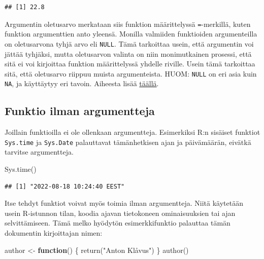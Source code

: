 \documentclass[
]{book}
\newenvironment{Shaded}{\begin{snugshade}}{\end{snugshade}}
\newcommand{\ControlFlowTok}[1]{\textcolor[rgb]{0.13,0.29,0.53}{\textbf{#1}}}
\newcommand{\FunctionTok}[1]{\textcolor[rgb]{0.00,0.00,0.00}{#1}}
\newcommand{\NormalTok}[1]{#1}
\newcommand{\OtherTok}[1]{\textcolor[rgb]{0.56,0.35,0.01}{#1}}
\newcommand{\StringTok}[1]{\textcolor[rgb]{0.31,0.60,0.02}{#1}}
\begin{document}
\begin{verbatim}
## [1] 22.8
\end{verbatim}

Argumentin oletusarvo merkataan siis funktion määrittelyssä \texttt{=}-merkillä, kuten funktion argumenttien anto yleensä. Monilla valmiiden funktioiden argumenteilla on oletusarvona tyhjä arvo eli \texttt{NULL}. Tämä tarkoittaa usein, että argumentin voi jättää tyhjäksi, mutta oletusarvon valinta on niin monimutkainen prosessi, että sitä ei voi kirjoittaa funktion määrittelyssä yhdelle riville. Usein tämä tarkoittaa sitä, että oletusarvo riippuu muista argumenteista. HUOM: \texttt{NULL} on eri asia kuin \texttt{NA}, ja käyttäytyy eri tavoin. Aiheesta lisää \href{https://www.r-bloggers.com/r-na-vs-null/}{täällä}.

\hypertarget{funktio-ilman-argumentteja}{%
\subsection{Funktio ilman argumentteja}\label{funktio-ilman-argumentteja}}

Joillain funktioilla ei ole ollenkaan argumentteja. Esimerkiksi R:n sisäiset funktiot \texttt{Sys.time} ja \texttt{Sys.Date} palauttavat tämänhetkisen ajan ja päivämäärän, eivätkä tarvitse argumentteja.

\begin{Shaded}
\begin{Highlighting}[]
\FunctionTok{Sys.time}\NormalTok{()}
\end{Highlighting}
\end{Shaded}

\begin{verbatim}
## [1] "2022-08-18 10:24:40 EEST"
\end{verbatim}

Itse tehdyt funktiot voivat myös toimia ilman argumentteja. Niitä käytetään usein R-istunnon tilan, koodia ajavan tietokoneen ominaisuuksien tai ajan selvittämiseen. Tämä melko hyödytön esimerkkifunktio palauttaa tämän dokumentin kirjoittajan nimen:

\begin{Shaded}
\begin{Highlighting}[]
\NormalTok{author }\OtherTok{\textless{}{-}} \ControlFlowTok{function}\NormalTok{() \{}
  \FunctionTok{return}\NormalTok{(}\StringTok{"Anton Klåvus"}\NormalTok{)}
\NormalTok{\}}
\FunctionTok{author}\NormalTok{()}
\end{Highlighting}
\end{Shaded}
\end{document}
